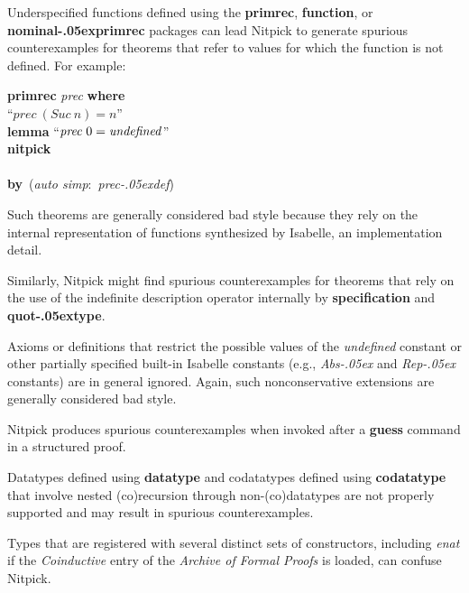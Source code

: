 \documentclass[a4paper,12pt]{article}
\renewcommand\_{\hbox{\textunderscore\kern-.05ex}}
\begin{document}
\begin{enum}
\item[\labelitemi] Underspecified functions defined using the \textbf{primrec},
\textbf{function}, or \textbf{nominal\_\allowbreak primrec} packages can lead
Nitpick to generate spurious counterexamples for theorems that refer to values
for which the function is not defined. For example:

\prew
\textbf{primrec} \textit{prec} \textbf{where} \\
``$\textit{prec}~(\textit{Suc}~n) = n$'' \\[2\smallskipamount]
\textbf{lemma} ``$\textit{prec}~0 = \textit{undefined\/}$'' \\
\textbf{nitpick} \\[2\smallskipamount]
 \nopagebreak\\[2\smallskipamount]
\textbf{by}~(\textit{auto simp}:~\textit{prec\_def})
\postw

Such theorems are generally considered bad style because they rely on the
internal representation of functions synthesized by Isabelle, an implementation
detail.

\item[\labelitemi] Similarly, Nitpick might find spurious counterexamples for
theorems that rely on the use of the indefinite description operator internally
by \textbf{specification} and \textbf{quot\_type}.

\item[\labelitemi] Axioms or definitions that restrict the possible values of the
\textit{undefined} constant or other partially specified built-in Isabelle
constants (e.g., \textit{Abs\_} and \textit{Rep\_} constants) are in general
ignored. Again, such nonconservative extensions are generally considered bad
style.

\item[\labelitemi] Nitpick produces spurious counterexamples when invoked after a
\textbf{guess} command in a structured proof.

\item[\labelitemi] Datatypes defined using \textbf{datatype} and
codatatypes defined using \textbf{codatatype} that involve nested (co)recursion
through non-(co)datatypes are not properly supported and may result in spurious
counterexamples.

\item[\labelitemi] Types that are registered with several distinct sets of
constructors, including \textit{enat} if the \textit{Coinductive} entry of
the \textit{Archive of Formal Proofs} is loaded, can confuse Nitpick.


\end{enum}
\end{document}
